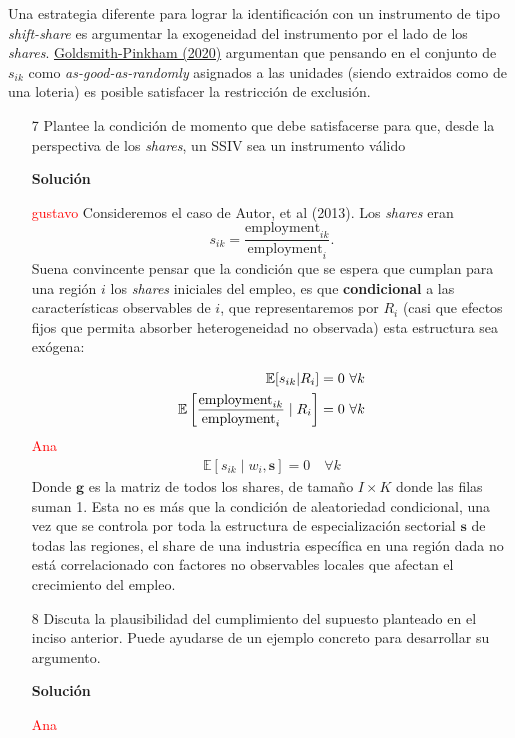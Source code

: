 \documentclass[a4paper, answers, addpoints, 11pt]{exam}
\newenvironment{solucion}{%
  \begin{mdframed}[
    backgroundcolor=blue!5,    %
    linecolor=blue!50,          %
    linewidth=2pt,              %
    leftmargin=10pt,            %
    rightmargin=8pt,           %
    topline=true,              %
    bottomline=true,            %
    roundcorner=10pt,           %
    innerleftmargin=10pt,       %
    innerrightmargin=10pt,      %
    innerbottommargin=10pt,     %
    innertopmargin=10pt         %
  ]%
  \begin{tcolorbox}[colframe=blue!50!black, colback=blue!50, coltitle=white, sharp corners=all, boxrule=1mm, width=\textwidth, halign=left, valign=center, top=0mm, bottom=0mm, left=0mm, right=0mm] \textbf{Solución} \end{tcolorbox} }{\end{mdframed}}
\begin{document}
Una estrategia diferente para lograr la identificación con un instrumento de tipo \textit{shift-share} es argumentar la exogeneidad del instrumento por el lado de los \textit{shares}. \href{https://paulgp.com/papers/bartik_gpss.pdf}{Goldsmith-Pinkham (2020)} argumentan que pensando en el conjunto de $s_{ik}$ como \textit{as-good-as-randomly} asignados a las unidades (siendo extraidos como de una loteria) es posible satisfacer la restricción de exclusión. 

\begin{enumerate}
    \item[7] Plantee la condición de momento que debe satisfacerse para que, desde la perspectiva de los \textit{shares}, un SSIV sea un  instrumento válido
    \begin{solucion}
    \textcolor{red}{gustavo}
    Consideremos el caso de Autor, et al (2013). Los \textit{shares} eran 
    \begin{equation}
        s_{ik}=\frac{\text{employment}_{ik}}{\text{employment}_{i}}.
    \end{equation}
    Suena convincente pensar que la condición que se espera que cumplan para una región $i$ los \textit{shares} iniciales del empleo, es que \textbf{condicional} a las características observables de $i$, que representaremos por $R_i$ (casi que efectos fijos que permita absorber heterogeneidad no observada)  
    esta estructura sea exógena:

    \begin{align}
        \mathbb{E}[s_{ik}|R_i]&=0 \ \notag  \forall k \\
        \mathbb{E}\left[\frac{\text{employment}_{ik}}{\text{employment}_i}\mid R_i\right]&=0 \ \forall k
    \end{align}
      \textcolor{red}{Ana}
\begin{align*}
\mathbb{E}[s_{ik} \mid w_i, \mathbf{s}] = 0 \quad \forall k
\end{align*}
Donde $\mathbf{g}$ es la matriz de todos los shares, de tamaño $I\times K$ donde las filas suman 1. Esta no es más que la condición de aleatoriedad condicional, una vez que se controla por toda la estructura de especialización sectorial  $\mathbf{s}$ de todas las regiones, el share de una industria específica en una región dada no está correlacionado con factores no observables locales que afectan el crecimiento del empleo.
 \end{solucion}

    \item[8] Discuta la plausibilidad del cumplimiento del supuesto planteado en el inciso anterior. Puede ayudarse de un ejemplo concreto para desarrollar su argumento.
    \begin{solucion}
    \textcolor{red}{Ana}
       

\end{solucion}
\end{enumerate}
\end{document}
